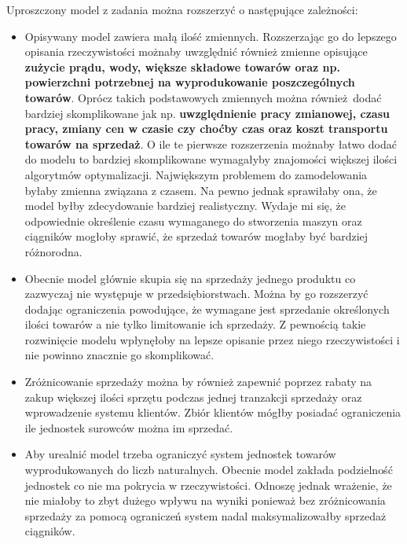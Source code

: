 \documentclass{article}
\begin{document}
Uproszczony model z zadania można rozszerzyć o następujące zależności:

\begin{itemize}
  \item Opisywany model zawiera małą ilość zmiennych. Rozszerzając go do lepszego opisania rzeczywistości możnaby uwzględnić również zmienne opisujące \textbf{zużycie prądu, wody, większe składowe towarów oraz np. powierzchni potrzebnej na wyprodukowanie poszczególnych towarów}. 
    Oprócz takich podstawowych zmiennych można również dodać bardziej skomplikowane jak np. \textbf{uwzględnienie pracy zmianowej, czasu pracy, zmiany cen w czasie czy choćby czas oraz koszt transportu towarów na sprzedaż}. O ile te pierwsze rozszerzenia możnaby łatwo dodać
    do modelu to bardziej skomplikowane wymagałyby znajomości większej ilości algorytmów optymalizacji. Największym problemem do zamodelowania byłaby zmienna związana z czasem. Na pewno jednak sprawiłaby ona, że model byłby zdecydowanie bardziej realistyczny. Wydaje mi się, że
    odpowiednie określenie czasu wymaganego do stworzenia maszyn oraz ciągników mogłoby sprawić, że sprzedaż towarów mogłaby być bardziej różnorodna.
  \item Obecnie model głównie skupia się na sprzedaży jednego produktu co zazwyczaj nie występuje w przedsiębiorstwach. Można by go rozszerzyć dodając ograniczenia powodujące, że wymagane jest sprzedanie określonych ilości towarów a nie tylko limitowanie ich sprzedaży. 
    Z pewnością takie rozwinięcie modelu wpłynęłoby na lepsze opisanie przez niego rzeczywistości i nie powinno znacznie go skomplikować.
  \item Zróżnicowanie sprzedaży można by również zapewnić poprzez rabaty na zakup większej ilości sprzętu podczas jednej tranzakcji sprzedaży oraz wprowadzenie systemu klientów. Zbiór klientów mógłby posiadać ograniczenia ile jednostek surowców można im sprzedać.
  \item Aby urealnić model trzeba ograniczyć system jednostek towarów wyprodukowanych do liczb naturalnych. Obecnie model zakłada podzielność jednostek co nie ma pokrycia w rzeczywistości. Odnoszę jednak wrażenie, że nie miałoby to zbyt dużego wpływu na wyniki ponieważ
    bez zróżnicowania sprzedaży za pomocą ograniczeń system nadal maksymalizowałby sprzedaż ciągników.
\end{itemize}
\end{document}
